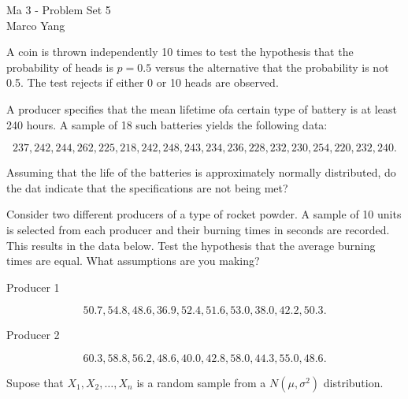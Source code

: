 \documentclass[answers]{exam}
\begin{document}
\begin{center}
{\Large Ma 3 - Problem Set 5} \\
\medskip
Marco Yang \\
\bigskip
\end{center}

\begin{questions}
\question [25] A coin is thrown independently 10 times to test the hypothesis
that the probability of heads is $p=0.5$ versus the alternative that the
probability is not 0.5. The test rejects if either 0 or 10 heads are observed.


\question [25] A producer specifies that the mean lifetime ofa certain type of
battery is at least 240 hours. A sample of 18 such batteries yields the
following data:

\[
237, 242, 244, 262, 225, 218, 242, 248, 243, 234, 236, 228, 232, 230, 254, 220, 232, 240
.\] 

Assuming that the life of the batteries is approximately normally distributed,
do the dat indicate that the specifications are not being met?

\question [25] Consider two different producers of a type of rocket powder. A
sample of 10 units is selected from each producer and their burning times in
seconds are recorded. This results in the data below. Test the hypothesis that
the average burning times are equal. What assumptions are you making?

Producer 1

\[
50.7, 54.8, 48.6, 36.9, 52.4, 51.6, 53.0, 38.0, 42.2, 50.3
.\] 

Producer 2

\[
60.3, 58.8, 56.2, 48.6, 40.0, 42.8, 58.0, 44.3, 55.0, 48.6
.\] 

\question [25] Supose that $X_1,X_2,\ldots,X_{n}$ is a random sample from a
$N(\mu, \sigma^2)$ distribution.

\begin{parts}

\end{parts}
\end{questions}
\end{document}

